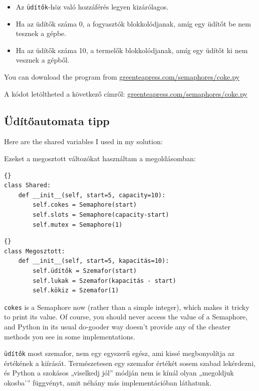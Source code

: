 \documentclass{book}
\newcommand{\clearemptydoublepage}{\newpage\cleardoublepage}
\begin{document}
\begin{itemize}

\item Az {\tt üdítők}-höz való hozzáférés legyen kizárólagos.

\item Ha az üdítők száma 0, a fogyasztók blokkolódjanak, amíg egy üdítőt
be nem tesznek a gépbe.

\item Ha az üdítők száma 10, a termelők blokkolódjanak, amíg egy üdítőt
ki nem vesznek a gépből.

\end{itemize}

You can download the program from
\url{greenteapress.com/semaphores/coke.py}

A kódot letöltheted a következő címről:
\url{greenteapress.com/semaphores/coke.py}

\clearemptydoublepage
\subsection{Üdítőautomata tipp}

Here are the shared variables I used in my solution:

Ezeket a megosztott változókat használtam a megoldásomban:

\begin{lstlisting}[title={}]{}
class Shared:
    def __init__(self, start=5, capacity=10):
        self.cokes = Semaphore(start)
        self.slots = Semaphore(capacity-start)
        self.mutex = Semaphore(1)
\end{lstlisting}

\begin{lstlisting}[title={Üdítőautomata tipp}]{}
class Megosztott:
    def __init__(self, start=5, kapacitás=10):
        self.üdítők = Szemafor(start)
        self.lukak = Szemafor(kapacitás - start)
        self.kökiz = Szemafor(1)
\end{lstlisting}

{\tt cokes} is a Semaphore now (rather than a simple integer), 
which makes it tricky to print its value.  Of course, you
should never access the value of a Semaphore, and Python in
its usual do-gooder way doesn't provide any of the cheater
methods you see in some implementations.

{\tt üdítők} most szemafor, nem egy egyszerű egész, ami kissé
megbonyolítja az értékének a kiírását. Természetesen egy
szemafor értékét sosem szabad lekérdezni, és Python a szokásos
„viselkedj jól” módján nem is kínál olyan „megoldjuk okosba'”
függvényt, amit néhány más implementációban láthatunk.
\end{document}
